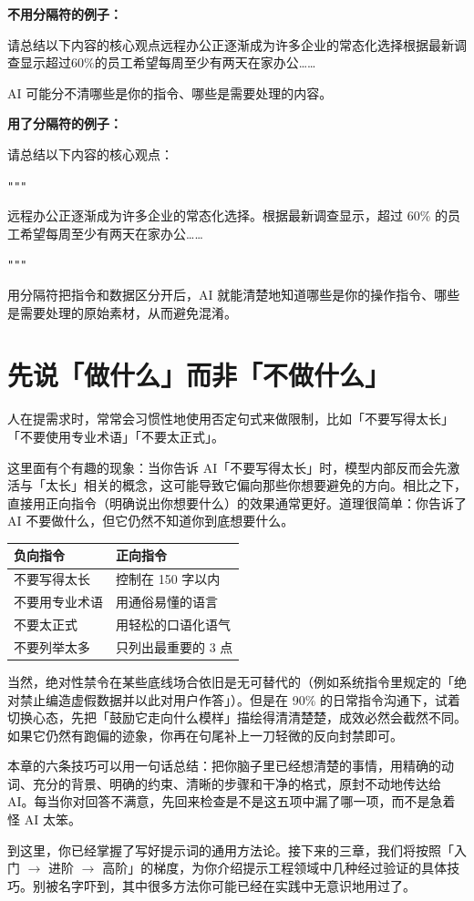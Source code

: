 \textbf{不用分隔符的例子：}
\begin{promptbox}
请总结以下内容的核心观点远程办公正逐渐成为许多企业的常态化选择根据最新调查显示超过60\%的员工希望每周至少有两天在家办公……
\end{promptbox}

AI 可能分不清哪些是你的指令、哪些是需要处理的内容。

\textbf{用了分隔符的例子：}
\begin{promptbox}
请总结以下内容的核心观点：

\verb|"""|

远程办公正逐渐成为许多企业的常态化选择。根据最新调查显示，超过 60\% 的员工希望每周至少有两天在家办公……

\verb|"""|
\end{promptbox}

用分隔符把指令和数据区分开后，AI 就能清楚地知道哪些是你的操作指令、哪些是需要处理的原始素材，从而避免混淆。

\section{先说「做什么」而非「不做什么」}

人在提需求时，常常会习惯性地使用否定句式来做限制，比如「不要写得太长」「不要使用专业术语」「不要太正式」。

这里面有个有趣的现象：当你告诉 AI「不要写得太长」时，模型内部反而会先激活与「太长」相关的概念，这可能导致它偏向那些你想要避免的方向。相比之下，直接用正向指令（明确说出你想要什么）的效果通常更好。道理很简单：你告诉了 AI 不要做什么，但它仍然不知道你到底想要什么。

\begin{center}
\begin{tabular}{ll}
  \toprule
  \textbf{负向指令} & \textbf{正向指令} \\
  \midrule
  不要写得太长 & 控制在 150 字以内 \\
  不要用专业术语 & 用通俗易懂的语言 \\
  不要太正式 & 用轻松的口语化语气 \\
  不要列举太多 & 只列出最重要的 3 点 \\
  \bottomrule
\end{tabular}
\end{center}

当然，绝对性禁令在某些底线场合依旧是无可替代的（例如系统指令里规定的「绝对禁止编造虚假数据并以此对用户作答」）。但是在 90\% 的日常指令沟通下，试着切换心态，先把「鼓励它走向什么模样」描绘得清清楚楚，成效必然会截然不同。如果它仍然有跑偏的迹象，你再在句尾补上一刀轻微的反向封禁即可。

\begin{tipbox}
本章的六条技巧可以用一句话总结：把你脑子里已经想清楚的事情，用精确的动词、充分的背景、明确的约束、清晰的步骤和干净的格式，原封不动地传达给 AI。每当你对回答不满意，先回来检查是不是这五项中漏了哪一项，而不是急着怪 AI 太笨。
\end{tipbox}

到这里，你已经掌握了写好提示词的通用方法论。接下来的三章，我们将按照「入门 $\to$ 进阶 $\to$ 高阶」的梯度，为你介绍提示工程领域中几种经过验证的具体技巧。别被名字吓到，其中很多方法你可能已经在实践中无意识地用过了。
